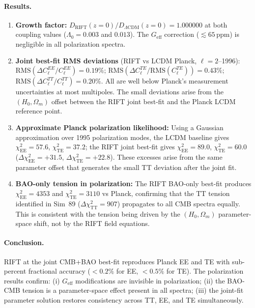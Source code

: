 \documentclass[12pt,a4paper]{article}
\begin{document}
\paragraph{Results.}
\begin{enumerate}
  \item \textbf{Growth factor:} $D_\mathrm{RIFT}(z=0)/D_{\Lambda\mathrm{CDM}}(z=0)=1.000000$
        at both coupling values ($\Lambda_0=0.003$ and $0.013$). The $G_\mathrm{eff}$
        correction ($\lesssim65\,\mathrm{ppm}$) is negligible in all polarization spectra.

  \item \textbf{Joint best-fit RMS deviations} (RIFT vs LCDM Planck, $\ell=2$--1996):
        $\mathrm{RMS}(\Delta C_\ell^{EE}/C_\ell^{EE}) = 0.19\%$;
        $\mathrm{RMS}(\Delta C_\ell^{TE}/\mathrm{RMS}(C_\ell^{TE})) = 0.43\%$;
        $\mathrm{RMS}(\Delta C_\ell^{TT}/C_\ell^{TT}) = 0.20\%$.
        All are well below Planck's measurement uncertainties at most multipoles.
        The small deviations arise from the $(H_0, \Omega_m)$ offset between the
        RIFT joint best-fit and the Planck LCDM reference point.

  \item \textbf{Approximate Planck polarization likelihood:} Using a Gaussian
        approximation over 1995 polarization modes, the LCDM baseline gives
        $\chi^2_\mathrm{EE}=57.6$, $\chi^2_\mathrm{TE}=37.2$; the RIFT joint
        best-fit gives $\chi^2_\mathrm{EE}=89.0$, $\chi^2_\mathrm{TE}=60.0$
        ($\Delta\chi^2_\mathrm{EE}=+31.5$, $\Delta\chi^2_\mathrm{TE}=+22.8$).
        These excesses arise from the same parameter offset that generates
        the small TT deviation after the joint fit.

  \item \textbf{BAO-only tension in polarization:} The RIFT BAO-only best-fit
        produces $\chi^2_\mathrm{EE}=4353$ and $\chi^2_\mathrm{TE}=3110$
        vs Planck, confirming that the TT tension identified in Sim~89
        ($\Delta\chi^2_\mathrm{TT}=907$) propagates to all CMB spectra equally.
        This is consistent with the tension being driven by the
        $(H_0, \Omega_m)$ parameter-space shift, not by the RIFT field equations.
\end{enumerate}

\paragraph{Conclusion.} RIFT at the joint CMB+BAO best-fit reproduces Planck
EE and TE with sub-percent fractional accuracy ($<0.2\%$ for EE, $<0.5\%$ for TE).
The polarization results confirm: (i) $G_\mathrm{eff}$ modifications are invisible
in polarization; (ii) the BAO-CMB tension is a parameter-space effect present in
all spectra; (iii) the joint-fit parameter solution restores consistency across
TT, EE, and TE simultaneously.
\end{document}
